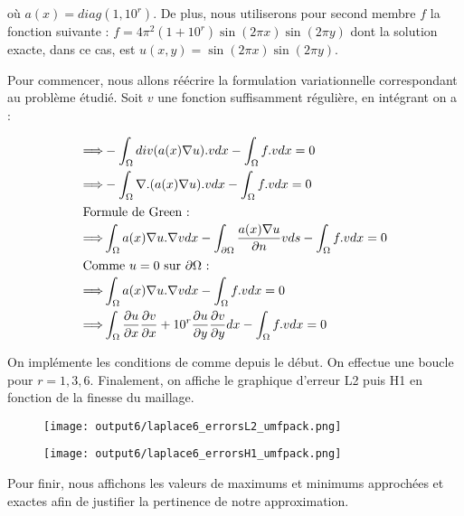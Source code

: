\documentclass[11pt,a4paper]{report}
\begin{document}
				où $a(x) = diag(1,10^r)$. De plus, nous utiliserons pour second membre $f$ la fonction suivante : $f = 4\pi^2(1+10^r)\sin(2\pi x)\sin(2\pi y)$ dont la solution exacte, dans ce cas, est $ u(x,y) = \sin(2\pi x)\sin(2\pi y)$.
				
				Pour commencer, nous allons réécrire la formulation variationnelle correspondant au problème étudié. Soit $v$ une fonction suffisamment régulière, en intégrant on a : 
				
				\begin{align*}
				\Longrightarrow &\displaystyle - \int_{\Omega} div(a(x) \nabla u).v dx - \int_{\Omega} f.v dx = 0 \\
				\Longrightarrow & \displaystyle - \int_{\Omega} \nabla.(a(x) \nabla u).v dx - \int_{\Omega} f.v dx = 0 \\
				\intertext{Formule de Green : }
				\Longrightarrow & \displaystyle \int_{\Omega} a(x)\nabla u.\nabla v dx - \int_{\partial \Omega} \dfrac{a(x) \nabla u}{\partial n} v ds -  \int_{\Omega} f.v dx = 0 \\
				\intertext{Comme $u = 0$ sur $\partial\Omega$ : }
				\Longrightarrow & \int_{\Omega} a(x)\nabla u.\nabla v dx -  \int_{\Omega} f.v dx = 0 \\
				\Longrightarrow & \int_{\Omega} \dfrac{\partial u}{\partial x} \dfrac{\partial v}{\partial x} + 10^r \dfrac{\partial u}{\partial y}\dfrac{\partial v}{\partial y} dx -\int_{\Omega} f.v dx = 0
				\end{align*}
				
				On implémente les conditions de  comme depuis le début. On effectue une boucle pour $ r = 1 ,3 ,6$. Finalement, on affiche le graphique d'erreur L2 puis H1 en fonction de la finesse du maillage.
				
				\begin{figure}[H]
					\centering
					\texttt{[image: output6/laplace6\_errorsL2\_umfpack.png]}
				\end{figure}
				
				\begin{figure}[H]
					\centering
					\texttt{[image: output6/laplace6\_errorsH1\_umfpack.png]}
				\end{figure}
				
				Pour finir, nous affichons les valeurs de maximums et minimums approchées et exactes afin de justifier la pertinence de notre approximation.
				
\end{document}
